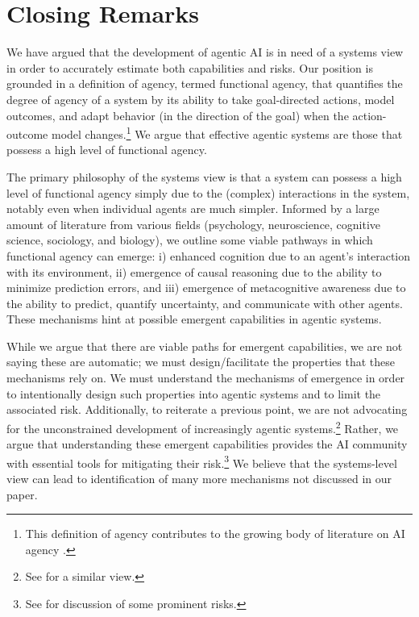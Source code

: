 \documentclass{article}
\theoremstyle{plain}
\theoremstyle{definition}
\theoremstyle{remark}
\begin{document}
\section{Closing Remarks}
\label{sec:alternative}

We have argued that the development of agentic AI is in need of a systems view in order to accurately estimate both capabilities and risks. Our position is grounded in a definition of agency, termed functional agency, that quantifies the degree of agency of a system by its ability to take goal-directed actions, model outcomes, and adapt behavior (in the direction of the goal) when the action-outcome model changes.\footnote{This definition of agency contributes to the growing body of literature on AI agency \cite{kenton2023discovering,barandiaran2024transforming,abel2025agency,zhang2025conceptualizing}.} We argue that effective agentic systems are those that possess a high level of functional agency.  

The primary philosophy of the systems view is that a system can possess a high level of functional agency simply due to the (complex) interactions in the system, notably even when individual agents are much simpler. Informed by a large amount of literature from various fields (psychology, neuroscience, cognitive science, sociology, and biology), we outline some viable pathways in which functional agency can emerge: i) enhanced cognition due to an agent's interaction with its environment, ii) emergence of causal reasoning due to the ability to minimize prediction errors, and iii) emergence of metacognitive awareness due to the ability to predict, quantify uncertainty, and communicate with other agents. These mechanisms hint at possible emergent capabilities in agentic systems.


While we argue that there are viable paths for emergent capabilities, we are not saying these are automatic; we must design/facilitate the properties that these mechanisms rely on. We must understand the mechanisms of emergence in order to intentionally design such properties into agentic systems and to limit the associated risk. Additionally, to reiterate a previous point, we are not advocating for the unconstrained development of increasingly agentic systems.\footnote{See \cite{mitchell2025fully} for a similar view.} Rather, we argue that understanding these emergent capabilities provides the AI community with essential tools for mitigating their risk.\footnote{See \cite{kolt2025lessons} for discussion of some prominent risks.} We believe that the systems-level view can lead to identification of many more mechanisms not discussed in our paper.
\end{document}
